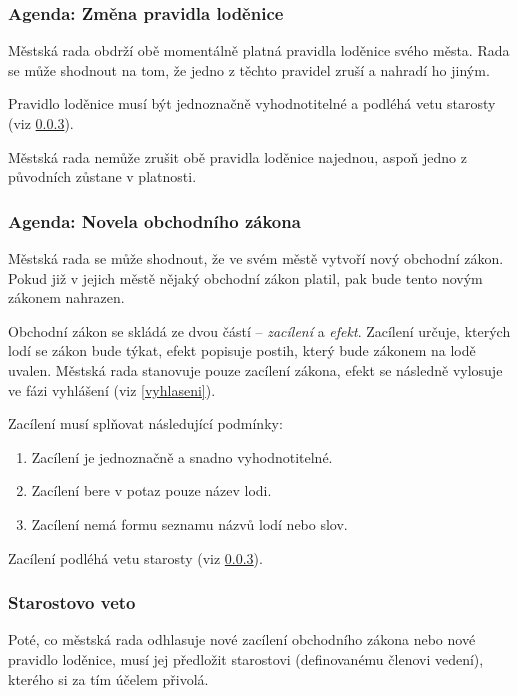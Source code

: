 \documentclass[a4paper, 12pt, twoside]{article}
\begin{document}
\subsubsection{Agenda: Změna pravidla loděnice}

Městská rada obdrží obě momentálně platná pravidla loděnice svého města.  Rada se může shodnout na tom, že jedno z těchto pravidel zruší a nahradí ho jiným.

Pravidlo loděnice musí být jednoznačně vyhodnotitelné a podléhá vetu starosty (viz \ref{veto}).

Městská rada nemůže zrušit obě pravidla loděnice najednou, aspoň jedno z původních zůstane v platnosti.

\subsubsection{Agenda: Novela obchodního zákona}

Městská rada se může shodnout, že ve svém městě vytvoří nový obchodní zákon.  Pokud již v jejich městě nějaký obchodní zákon platil, pak bude tento novým
zákonem nahrazen.

Obchodní zákon se skládá ze dvou částí -- \emph{zacílení} a \emph{efekt}.  Zacílení určuje, kterých lodí se zákon bude týkat, efekt popisuje postih, který
bude zákonem na lodě uvalen.  Městská rada stanovuje pouze zacílení zákona, efekt se následně vylosuje ve fázi vyhlášení (viz \ref{vyhlaseni}).

Zacílení musí splňovat následující podmínky:

\begin{enumerate}
    \item Zacílení je jednoznačně a snadno vyhodnotitelné.
    \item Zacílení bere v potaz pouze název lodi.
    \item Zacílení nemá formu seznamu názvů lodí nebo slov.
\end{enumerate}

Zacílení podléhá vetu starosty (viz \ref{veto}). 

\subsubsection{Starostovo veto}

\label{veto}

Poté, co městská rada odhlasuje nové zacílení obchodního zákona nebo nové pravidlo loděnice, musí jej předložit starostovi (definovanému členovi vedení), kterého
si za tím účelem přivolá.
\end{document}
